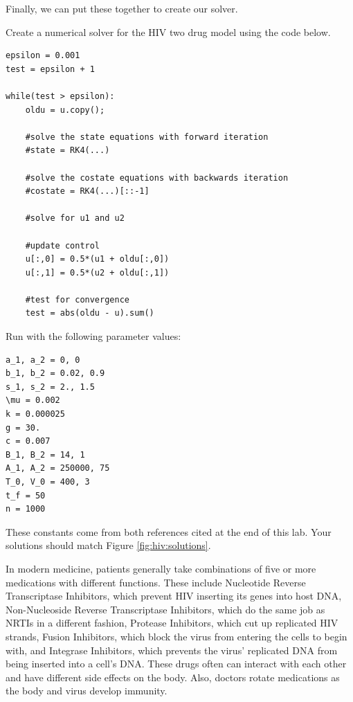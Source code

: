 Finally, we can put these together to create our solver.
\begin{problem}
Create a numerical solver for the HIV two drug model using the code below.

\begin{lstlisting}
epsilon = 0.001
test = epsilon + 1

while(test > epsilon):
	oldu = u.copy();
    
	#solve the state equations with forward iteration
	#state = RK4(...)
    
	#solve the costate equations with backwards iteration
	#costate = RK4(...)[::-1]
	
	#solve for u1 and u2
    
	#update control
	u[:,0] = 0.5*(u1 + oldu[:,0])
	u[:,1] = 0.5*(u2 + oldu[:,1])

	#test for convergence
	test = abs(oldu - u).sum()
\end{lstlisting}

Run with the following parameter values:
\begin{lstlisting}
a_1, a_2 = 0, 0
b_1, b_2 = 0.02, 0.9
s_1, s_2 = 2., 1.5
\mu = 0.002
k = 0.000025
g = 30.
c = 0.007
B_1, B_2 = 14, 1
A_1, A_2 = 250000, 75
T_0, V_0 = 400, 3
t_f = 50
n = 1000
\end{lstlisting}
These constants come from both references cited at the end of this lab. Your solutions should match Figure \ref{fig:hiv:solutions}.
\label{problem:hiv:solver}

\label{problem:hiv:numericalsolver}
\end{problem}

In modern medicine, patients generally take combinations of five or more medications with different functions. These include Nucleotide Reverse Transcriptase Inhibitors, which prevent HIV inserting its genes into host DNA, Non-Nucleoside Reverse Transcriptase Inhibitors, which do the same job as NRTIs in a different fashion, Protease Inhibitors, which cut up replicated HIV strands, Fusion Inhibitors, which block the virus from entering the cells to begin with, and Integrase Inhibitors, which prevents the virus' replicated DNA from being inserted into a cell's DNA. These drugs often can interact with each other and have different side effects on the body. Also, doctors rotate medications as the body and virus develop immunity. 

%
%

